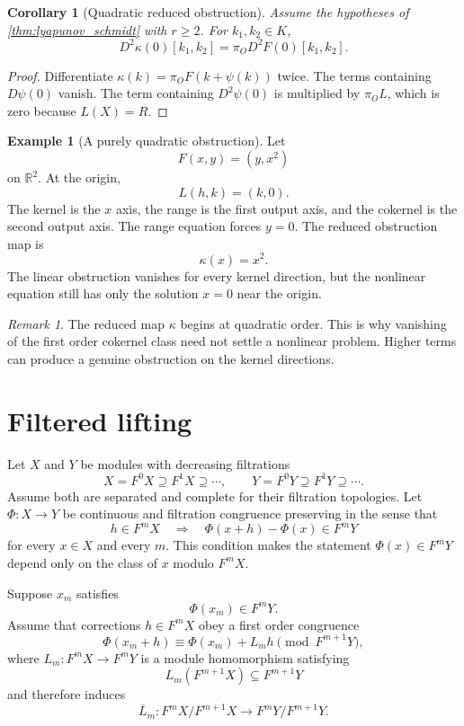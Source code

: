 \documentclass[11pt,a4paper]{article}
\theoremstyle{plain}
\newtheorem{corollary}[corollary]{Corollary}
\theoremstyle{definition}
\newtheorem{example}[example]{Example}
\theoremstyle{remark}
\newtheorem{remark}[remark]{Remark}
\begin{document}
\begin{corollary}[Quadratic reduced obstruction]\label{cor:quadratic_reduced_obstruction}
Assume the hypotheses of \cref{thm:lyapunov_schmidt} with $r\ge2$.  For $k_1,k_2\in K$,
\[
D^2\kappa(0)[k_1,k_2]
=
\pi_O D^2F(0)[k_1,k_2].
\]
\end{corollary}

\begin{proof}
Differentiate $\kappa(k)=\pi_OF(k+\psi(k))$ twice.  The terms containing $D\psi(0)$ vanish.  The term containing $D^2\psi(0)$ is multiplied by $\pi_OL$, which is zero because $L(X)=R$.
\end{proof}

\begin{example}[A purely quadratic obstruction]\label{ex:pure_quadratic_obstruction}
Let
\[
F(x,y)=(y,x^2)
\]
on $\mathbb R^2$.  At the origin,
\[
L(h,k)=(k,0).
\]
The kernel is the $x$ axis, the range is the first output axis, and the cokernel is the second output axis.  The range equation forces $y=0$.  The reduced obstruction map is
\[
\kappa(x)=x^2.
\]
The linear obstruction vanishes for every kernel direction, but the nonlinear equation still has only the solution $x=0$ near the origin.
\end{example}

\begin{remark}\label{rem:higher_obstruction}
The reduced map $\kappa$ begins at quadratic order.  This is why vanishing of the first order cokernel class need not settle a nonlinear problem.  Higher terms can produce a genuine obstruction on the kernel directions.
\end{remark}

\section{Filtered lifting}\label{sec:filtered_lifting}

Let $X$ and $Y$ be modules with decreasing filtrations
\[
X=F^0X\supseteq F^1X\supseteq\cdots,
\qquad
Y=F^0Y\supseteq F^1Y\supseteq\cdots.
\]
Assume both are separated and complete for their filtration topologies.  Let $\Phi:X\to Y$ be continuous and filtration congruence preserving in the sense that
\[
h\in F^mX
\quad\Longrightarrow\quad
\Phi(x+h)-\Phi(x)\in F^mY
\]
for every $x\in X$ and every $m$.  This condition makes the statement $\Phi(x)\in F^mY$ depend only on the class of $x$ modulo $F^mX$.

Suppose $x_m$ satisfies
\[
\Phi(x_m)\in F^mY.
\]
Assume that corrections $h\in F^mX$ obey a first order congruence
\[
\Phi(x_m+h)
\equiv
\Phi(x_m)+L_mh
\pmod{F^{m+1}Y},
\]
where $L_m:F^mX\to F^mY$ is a module homomorphism satisfying
\[
L_m(F^{m+1}X)\subseteq F^{m+1}Y
\]
and therefore induces
\[
\overline L_m:
F^mX/F^{m+1}X
\longrightarrow
F^mY/F^{m+1}Y.
\]
\end{document}
